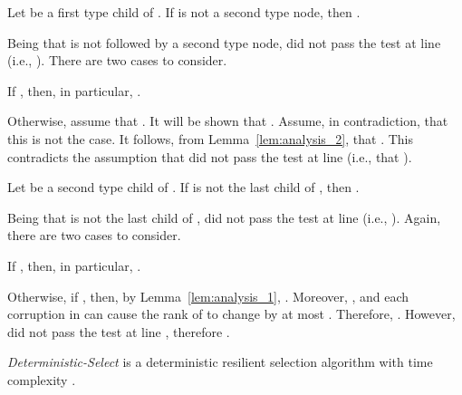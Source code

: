 \documentclass{llncs}
\begin{document}
\begin{lemma}
\label{lem:first_phase_repetitions}
Let  be a first type child of . If  is not a second type node, then .
\end{lemma}

\begin{pf}
Being that  is not followed by a second type node,  did not pass the test at line  (i.e., ). There are two cases to consider.

If , then, in particular, .

Otherwise, assume that . It will be shown that . Assume, in contradiction, that this is not the case. It follows, from Lemma~\ref{lem:analysis_2}, that . This contradicts the assumption that  did not pass the test at line  (i.e., that ).~\end{pf}











\begin{lemma}
\label{lem:second_phase_repetitions}
Let  be a second type child of . If  is not the last child of , then .
\end{lemma}

\begin{pf}
Being that  is not the last child of ,  did not pass the test at line  (i.e., ). Again, there are two cases to consider.

If , then, in particular, .

Otherwise, if , then, by Lemma~\ref{lem:analysis_1}, . Moreover, , and each corruption in  can cause the rank of  to change by at most . Therefore, . However,  did not pass the test at line , therefore .
\end{pf}






























\begin{theorem}\label{theorem:det_select_alpha}
\emph{Deterministic-Select} is a deterministic resilient selection algorithm with time complexity .
\end{theorem}
\end{document}
